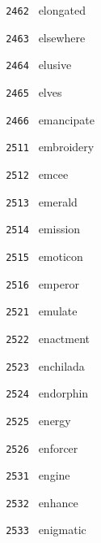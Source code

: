 \documentclass[11pt]{article}
\begin{document}
\begin{multicols}{6}
\noindent \texttt{ 2462 } \hspace{1mm} elongated  \par
\noindent \texttt{ 2463 } \hspace{1mm} elsewhere  \par
\noindent \texttt{ 2464 } \hspace{1mm} elusive  \par
\noindent \texttt{ 2465 } \hspace{1mm} elves  \par
\noindent \texttt{ 2466 } \hspace{1mm} emancipate  \par
\noindent \texttt{ 2511 } \hspace{1mm} embroidery  \par
\noindent \texttt{ 2512 } \hspace{1mm} emcee  \par
\noindent \texttt{ 2513 } \hspace{1mm} emerald  \par
\noindent \texttt{ 2514 } \hspace{1mm} emission  \par
\noindent \texttt{ 2515 } \hspace{1mm} emoticon  \par
\noindent \texttt{ 2516 } \hspace{1mm} emperor  \par
\noindent \texttt{ 2521 } \hspace{1mm} emulate  \par
\noindent \texttt{ 2522 } \hspace{1mm} enactment  \par
\noindent \texttt{ 2523 } \hspace{1mm} enchilada  \par
\noindent \texttt{ 2524 } \hspace{1mm} endorphin  \par
\noindent \texttt{ 2525 } \hspace{1mm} energy  \par
\noindent \texttt{ 2526 } \hspace{1mm} enforcer  \par
\noindent \texttt{ 2531 } \hspace{1mm} engine  \par
\noindent \texttt{ 2532 } \hspace{1mm} enhance  \par
\noindent \texttt{ 2533 } \hspace{1mm} enigmatic  \par

\end{multicols}
\end{document}
